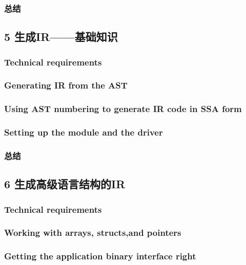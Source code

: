 \documentclass[11pt,a4paper,UTF8]{ctexart}
\begin{document}
		\subsubsection{总结}
	\subsection{5 生成IR——基础知识}
		\subsubsection{Technical requirements}
		\subsubsection{Generating IR from the AST}
		\subsubsection{Using AST numbering to generate IR code in SSA form}
		\subsubsection{Setting up the module and the driver}
		\subsubsection{总结}
	\subsection{6 生成高级语言结构的IR}
		\subsubsection{Technical requirements}
		\subsubsection{Working with arrays, structs,and pointers}
		\subsubsection{Getting the application binary interface right}
\end{document}
